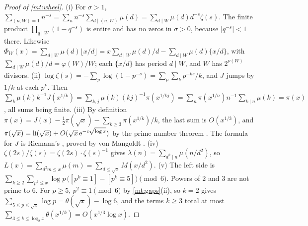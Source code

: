 \documentclass[11pt]{article}
\theoremstyle{definition}\newtheorem{definition}[theorem]{Definition}
\theoremstyle{remark}\newtheorem{remark}[theorem]{Remark}
\theoremstyle{definition}\newtheorem{axiom}{Axiom}
\newcommand{\fr}[1]{\{#1\}}
\newcommand{\li}{\operatorname{li}}\newcommand{\Tr}{\operatorname{Tr}}
\begin{document}
\begin{proof}[Proof of \cref{mt:wheel}]
(i) For $\sigma>1$, $\sum_{(n,W)=1}n^{-s}=\sum_nn^{-s}\sum_{d\mid(n,W)}\mu(d)=\sum_{d\mid W}\mu(d)d^{-s}\zeta(s)$. The finite product $\prod_{q\mid W}(1-q^{-s})$ is entire and has no zeros in $\sigma>0$, because $|q^{-s}|<1$ there. Likewise $\Phi_W(x)=\sum_{d\mid W}\mu(d)\lfloor x/d\rfloor=x\sum_{d\mid W}\mu(d)/d-\sum_{d\mid W}\mu(d)\fr{x/d}$, with $\sum_{d\mid W}\mu(d)/d=\varphi(W)/W$; each $\fr{x/d}$ has period $d\mid W$, and $W$ has $2^{\nu(W)}$ divisors.
(ii) $\log\zeta(s)=-\sum_p\log(1-p^{-s})=\sum_p\sum_kp^{-ks}/k$, and $J$ jumps by $1/k$ at each $p^k$. Then $\sum_k\mu(k)k^{-1}J(x^{1/k})=\sum_{k,j}\mu(k)(kj)^{-1}\pi(x^{1/kj})=\sum_n\pi(x^{1/n})n^{-1}\sum_{k\mid n}\mu(k)=\pi(x)$, all sums being finite.
(iii) By definition $\pi(x)=J(x)-\frac12\pi(\sqrt x)-\sum_{k\ge3}\pi(x^{1/k})/k$, the last sum is $O(x^{1/3})$, and $\pi(\sqrt x)=\li(\sqrt x)+O(\sqrt x\,\e^{-c\sqrt{\log x}})$ by the prime number theorem \cite[Ch.~18]{Davenport}. The formula for $J$ is Riemann's \cite{Riemann}, proved by von Mangoldt \cite{vonMangoldt}.
(iv) $\zeta(2s)/\zeta(s)=\zeta(2s)\cdot\zeta(s)^{-1}$ gives $\lambda(n)=\sum_{d^2\mid n}\mu(n/d^2)$, so $L(x)=\sum_{d^2m\le x}\mu(m)=\sum_{d\le\sqrt x}M(x/d^2)$.
(v) The left side is $\sum_{k\ge2}\sum_{p^k\le x}\log p\,\bigl([p^k\equiv1]-[p^k\equiv5]\bigr)\pmod6$. Powers of $2$ and $3$ are not prime to $6$. For $p\ge5$, $p^2\equiv1\pmod6$ by \cref{mt:gaps}(ii), so $k=2$ gives $\sum_{5\le p\le\sqrt x}\log p=\theta(\sqrt x)-\log6$, and the terms $k\ge3$ total at most $\sum_{3\le k\le\log_2x}\theta(x^{1/k})=O(x^{1/3}\log x)$.
\end{proof}
\end{document}
